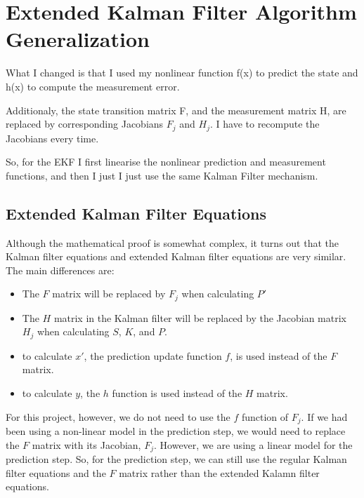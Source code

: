 \documentclass[11pt, a4paper]{article}
\begin{document}
\section{Extended Kalman Filter Algorithm Generalization}%
\label{sec:ekf_generalization}



What I changed is that I used my nonlinear function f(x) to predict the state and h(x) to compute the measurement error.


Additionaly, the state transition matrix F, and the measurement matrix H, are replaced by corresponding Jacobians $F_j$ and $H_j$. I have to recompute the Jacobians every time. 

So, for the EKF I first linearise the nonlinear prediction and measurement functions, and then I just I just use the same Kalman Filter mechanism.



\subsection{Extended Kalman Filter Equations}%
\label{sub:extended_kalman_filter_equations}



Although the mathematical proof is somewhat complex, it turns out that the Kalman filter equations and extended Kalman filter equations are very similar. The main differences are:

\begin{itemize}
	\item The $F$ matrix will be replaced by $F_j$ when calculating $P'$
	\item The $H$ matrix in the Kalman filter will be replaced by the Jacobian matrix $H_j$ when calculating $S$, $K$, and $P$. 
	\item to calculate $x'$, the prediction update function $f$, is used instead of the $F$ matrix.
	\item to calculate $y$, the $h$ function is used instead of the $H$ matrix.
\end{itemize}


For this project, however, we do not need to use the $f$ function of $F_j$. If we had been using a non-linear model in the prediction step, we would need to replace the $F$ matrix with its Jacobian, $F_j$. However, we are using a linear model for the prediction step. So, for the prediction step, we can still use the regular Kalman filter equations and the $F$ matrix rather than the extended Kalamn filter equations.
\end{document}
